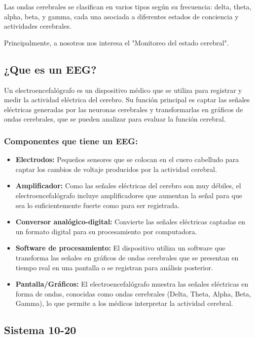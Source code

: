 \documentclass{article}
\begin{document}
Las ondas cerebrales se clasifican en varios tipos según su frecuencia: delta, theta, alpha, beta, y gamma, cada una asociada a diferentes estados de conciencia y actividades cerebrales.

Principalmente, a nosotros nos interesa el "Monitoreo del estado cerebral".

\subsection{¿Que es un EEG?}

Un electroencefalógrafo es un dispositivo médico que se utiliza para registrar y medir la actividad eléctrica del cerebro. Su función principal es captar las señales eléctricas generadas por las neuronas cerebrales y transformarlas en gráficos de ondas cerebrales, que se pueden analizar para evaluar la función cerebral.
\subsubsection{Componentes que tiene un EEG:}
\begin{itemize}
    \item \textbf{Electrodos:} Pequeños sensores que se colocan en el cuero cabelludo para captar los cambios de voltaje producidos por la actividad cerebral.
    \item \textbf{Amplificador:} Como las señales eléctricas del cerebro son muy débiles, el electroencefalógrafo incluye amplificadores que aumentan la señal para que sea lo suficientemente fuerte como para ser registrada.
    \item \textbf{Conversor analógico-digital:} Convierte las señales eléctricas captadas en un formato digital para su procesamiento por computadora.
    \item \textbf{Software de procesamiento:} El dispositivo utiliza un software que transforma las señales en gráficos de ondas cerebrales que se presentan en tiempo real en una pantalla o se registran para análisis posterior.
    \item \textbf{Pantalla/Gráficos:} El electroencefalógrafo muestra las señales eléctricas en forma de ondas, conocidas como ondas cerebrales (Delta, Theta, Alpha, Beta, Gamma), lo que permite a los médicos interpretar la actividad cerebral.
\end{itemize}

\subsection{Sistema 10-20}
\end{document}
